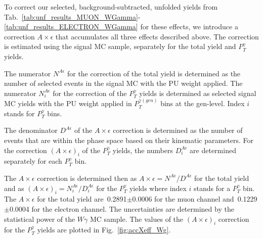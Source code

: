 To correct our selected, background-subtracted, unfolded yields from Tab.~\ref{tab:unf_results_MUON_WGamma}-\ref{tab:unf_results_ELECTRON_WGamma} for these effects, we introduce a correction $A \times \epsilon$ that accumulates all three effects described above. The correction is estimated using the signal MC sample, separately for the total yield and $P_T^{\gamma}$ yields. 

The numerator $N^{A\epsilon}$ for the correction of the total yield is determined as the number of selected events in the signal MC with the PU weight applied. The numerator $N^{A\epsilon}_i$ for the correction of the  $P_T^{\gamma}$ yields is determined as selected signal MC yields with the PU weight applied in $P_T^{\gamma(gen)}$ bins at the gen-level. Index $i$ stands for $P_T^{\gamma}$ bins.

The denominator $D^{A\epsilon}$ of the $A \times \epsilon$ correction is determined as the number of events that are within the phase space based on their kinematic parameters. For the correction $(A \times \epsilon)_i$ of the $P_T^{\gamma}$ yields, the numbers $D^{A\epsilon}_{i}$ are determined separately for each $P_T^\gamma$ bin.  

The $A \times \epsilon$ correction is determined then as $A \times \epsilon = N^{A\epsilon}/D^{A\epsilon}$ for the total yield and as $(A \times \epsilon)_i = N^{A\epsilon}_i/{D^{A\epsilon}_i}$ for the $P_T^{\gamma}$ yields where index $i$ stands for a $P_T^{\gamma}$ bin. The $A \times \epsilon$ for the total yield are~0.2891$\pm$0.0006 for the muon channel and~0.1229$\pm$0.0004 for the electron channel. The uncertainties are determined by the statistical power of the $W\gamma$ MC sample. The values of the $(A \times \epsilon)_i$ correction for the $P_T^{\gamma}$ yields are plotted in Fig.~\ref{fig:accXeff_Wg}.

